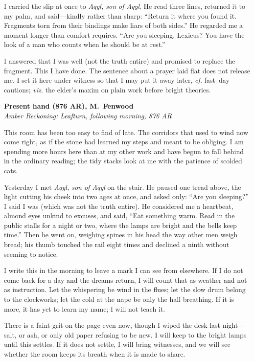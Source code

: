 \documentclass[11pt]{article}
\begin{document}
I carried the slip at once to \textit{Aqyl, son of Aqyl}. He read three lines, returned it to my palm, and said—kindly rather than sharp: “Return it where you found it. Fragments torn from their bindings make liars of both sides.” He regarded me a moment longer than comfort requires. “Are you sleeping, Lexicus? You have the look of a man who counts when he should be at rest.”

I answered that I was well (not the truth entire) and promised to replace the fragment. This I have done. The sentence about a prayer laid flat does not release me. I set it here under witness so that I may put it away later, \emph{cf.} fast–day cautions; \emph{viz.} the elder’s maxim on plain work before bright theories.

\medskip
\noindent\textbf{Present hand (876 AR), M.\ Fenwood}\\
\noindent\textit{Amber Reckoning: Leafturn, following morning, 876 AR}

This room has been too easy to find of late. The corridors that used to wind now come right, as if the stone had learned my steps and meant to be obliging. I am spending more hours here than at my other work and have begun to fall behind in the ordinary reading; the tidy stacks look at me with the patience of scolded cats.

Yesterday I met \textit{Aqyl, son of Aqyl} on the stair. He paused one tread above, the light cutting his cheek into two ages at once, and asked only: “Are you sleeping?” I said I was (which was not the truth entire). He considered me a heartbeat, almond eyes unkind to excuses, and said, “Eat something warm. Read in the public stalls for a night or two, where the lamps are bright and the bells keep time.” Then he went on, weighing spines in his head the way other men weigh bread; his thumb touched the rail eight times and declined a ninth without seeming to notice.

I write this in the morning to leave a mark I can see from elsewhere. If I do not come back for a day and the dreams return, I will count that as weather and not as instruction. Let the whispering be wind in the flues; let the slow drum belong to the clockworks; let the cold at the nape be only the hall breathing. If it is more, it has yet to learn my name; I will not teach it.

There is a faint grit on the page even now, though I wiped the desk last night—salt, or ash, or only old paper refusing to be new. I will keep to the bright lamps until this settles. If it does not settle, I will bring witnesses, and we will see whether the room keeps its breath when it is made to share.
\end{document}
